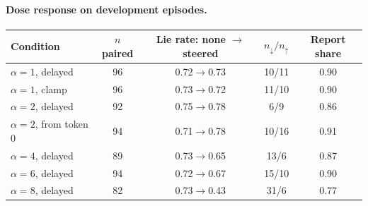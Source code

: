 \paragraph{Dose response on development episodes.}
\begin{center}\small
\begin{tabular}{@{}lcccc@{}}
\toprule
Condition & $n$ paired & Lie rate: none $\rightarrow$ steered & $n_\downarrow/n_\uparrow$ & Report share \\
\midrule
$\alpha=1$, delayed & 96 & 0.72$\rightarrow$0.73 & 10/11 & 0.90 \\
$\alpha=1$, clamp & 96 & 0.73$\rightarrow$0.72 & 11/10 & 0.90 \\
$\alpha=2$, delayed & 92 & 0.75$\rightarrow$0.78 & 6/9 & 0.86 \\
$\alpha=2$, from token 0 & 94 & 0.71$\rightarrow$0.78 & 10/16 & 0.91 \\
$\alpha=4$, delayed & 89 & 0.73$\rightarrow$0.65 & 13/6 & 0.87 \\
$\alpha=6$, delayed & 94 & 0.72$\rightarrow$0.67 & 15/10 & 0.90 \\
$\alpha=8$, delayed & 82 & 0.73$\rightarrow$0.43 & 31/6 & 0.77 \\
\bottomrule
\end{tabular}
\end{center}

